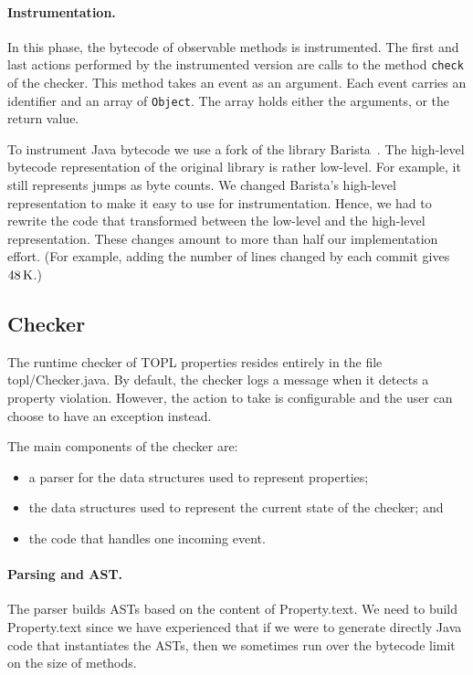 \documentclass[10pt, preprint]{sigplanconf} %
\begin{document}
\paragraph{Instrumentation.}

In this phase, the bytecode of observable methods is instrumented.
The first and last actions performed by the instrumented version are calls to the method {\tt check} of the checker.
This method takes an event as an argument.
Each event carries an identifier and an array of {\tt Object}.
The array holds either the arguments, or the return value.

To instrument Java bytecode we use a fork of the library Barista~\cite{barista}.
The high-level bytecode representation of the original library is rather low-level.
For example, it still represents jumps as byte counts.
We changed Barista's high-level representation to make it easy to use for instrumentation.
Hence, we had to rewrite the code that transformed between the low-level and the high-level representation.
These changes amount to more than half our implementation effort.
(For example, adding the number of lines changed by each commit gives $48\rm\,K$.)


\subsection{Checker} %

The runtime checker of TOPL properties resides entirely in the file {\sf topl/Checker.java}.
By default, the checker logs a message when it detects a property violation. However, the action to take is configurable and the user can choose to have an exception instead.

The main components of the checker are:
\begin{itemize}
\item a parser for the data structures used to represent properties;
\item the data structures used to represent the current state of the checker; and
\item the code that handles one incoming event.
\end{itemize}

\paragraph{Parsing and AST\null.}
The parser builds ASTs based on the content of \textsf{Property.text}.
We need to build \textsf{Property.text} since we have experienced that if we were to
 generate directly Java code that instantiates the ASTs,
 then we sometimes run over the bytecode limit on the size of methods.
\end{document}
